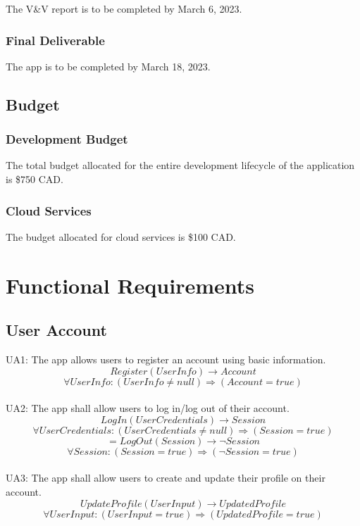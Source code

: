 \documentclass[12pt]{article}
\begin{document}
The V&V report is to be completed by March 6, 2023.

\subsubsection{Final Deliverable}

The app is to be completed by March 18, 2023.

\subsection{Budget}

\subsubsection{Development Budget}

The total budget allocated for the entire development lifecycle of the application is \$750 CAD.

\subsubsection{Cloud Services}

The budget allocated for cloud services is \$100 CAD.

\section{Functional Requirements}

\subsection{User Account}

\parindent UA1: The app allows users to register an account using basic information.
\[Register(UserInfo) \rightarrow Account \]
\[ \forall UserInfo: (UserInfo \neq null) \Rightarrow (Account = true) \]\\

UA2: The app shall allow users to log in/log out of their account.
\[LogIn(UserCredentials) \rightarrow Session \]
\[ \forall UserCredentials: (UserCredentials \neq null) \Rightarrow (Session = true) \]
\[=LogOut(Session) \rightarrow \neg Session \]
\[ \forall Session: (Session = true) \Rightarrow (\neg Session = true) \]\\

UA3: The app shall allow users to create and update their profile on their account.
\[UpdateProfile(UserInput) \rightarrow UpdatedProfile \]
\[ \forall UserInput: (UserInput = true) \Rightarrow (UpdatedProfile = true) \]\\
\end{document}
